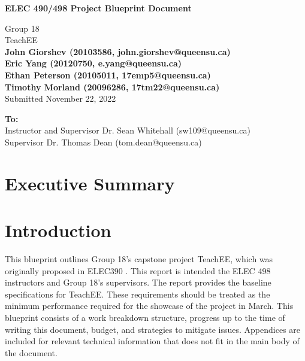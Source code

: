 \documentclass[letterpaper,12pt]{article}
\begin{document}
\begin{titlepage}
    \begin{center}
        \vspace*{1cm}

        \Large
        \textbf{ELEC 490/498 Project Blueprint Document}

        \vspace{0.5cm}
        Group 18\\
        TeachEE\\
        \vspace{0.5cm}
        \normalsize
        \textbf{John Giorshev (20103586, john.giorshev@queensu.ca) \\ Eric Yang (20120750, e.yang@queensu.ca) \\ Ethan Peterson (20105011, 17emp5@queensu.ca) \\ Timothy Morland (20096286, 17tm22@queensu.ca)}\\
        \vspace{0.5cm}
        Submitted November 22, 2022\\

        \vfill
            
        \textbf{To:}\\
        Instructor and Supervisor Dr. Sean Whitehall (sw109@queensu.ca) \\
        Supervisor Dr. Thomas Dean (tom.dean@queensu.ca) \\
            
        \vspace{1.8cm}

    \end{center}
\end{titlepage}
\section*{Executive Summary}
\newpage

\tableofcontents
\listoffigures
\listoftables
\newpage
{}
\section{Introduction} \label{sec:intro} %
This blueprint outlines Group 18's capstone project TeachEE, which was
originally proposed in ELEC390 \cite{prop_390}. This report is intended the ELEC 498 instructors
and Group 18's supervisors. The report provides the baseline specifications for
TeachEE. These requirements should be treated as the minimum performance
required for the showcase of the project in March. This blueprint consists of a
work breakdown structure, progress up to the time of writing this document,
budget, and strategies to mitigate issues. Appendices are
included for relevant technical information that does not fit in the main body
of the document.
\end{document}
